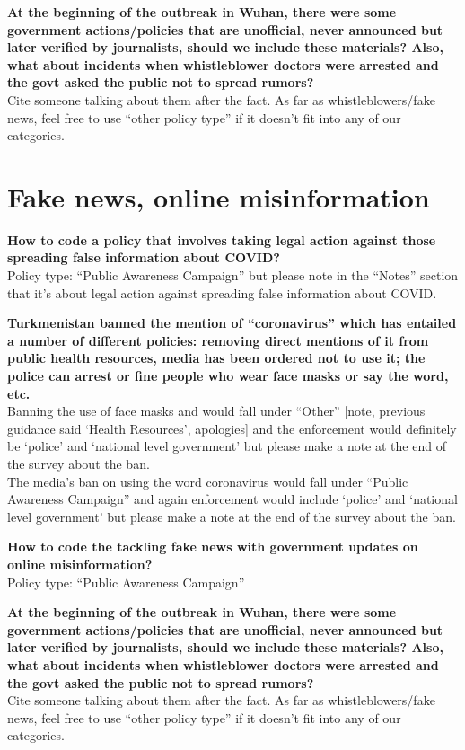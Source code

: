 \documentclass[
]{book}
\begin{document}
\textbf{At the beginning of the outbreak in Wuhan, there were some government actions/policies that are unofficial, never announced but later verified by journalists, should we include these materials? Also, what about incidents when whistleblower doctors were arrested and the govt asked the public not to spread rumors?}\\
Cite someone talking about them after the fact. As far as whistleblowers/fake news, feel free to use ``other policy type'' if it doesn't fit into any of our categories.

\hypertarget{fake-news-online-misinformation}{%
\section{Fake news, online misinformation}\label{fake-news-online-misinformation}}

\textbf{How to code a policy that involves taking legal action against those spreading false information about COVID?}\\
Policy type: ``Public Awareness Campaign'' but please note in the ``Notes'' section that it's about legal action against spreading false information about COVID.

\textbf{Turkmenistan banned the mention of ``coronavirus'' which has entailed a number of different policies: removing direct mentions of it from public health resources, media has been ordered not to use it; the police can arrest or fine people who wear face masks or say the word, etc.}\\
Banning the use of face masks and would fall under ``Other'' {[}note, previous guidance said `Health Resources', apologies{]} and the enforcement would definitely be `police' and `national level government' but please make a note at the end of the survey about the ban.\\
The media's ban on using the word coronavirus would fall under ``Public Awareness Campaign'' and again enforcement would include `police' and `national level government' but please make a note at the end of the survey about the ban.

\textbf{How to code the tackling fake news with government updates on online misinformation?}\\
Policy type: ``Public Awareness Campaign''

\textbf{At the beginning of the outbreak in Wuhan, there were some government actions/policies that are unofficial, never announced but later verified by journalists, should we include these materials? Also, what about incidents when whistleblower doctors were arrested and the govt asked the public not to spread rumors?}\\
Cite someone talking about them after the fact. As far as whistleblowers/fake news, feel free to use ``other policy type'' if it doesn't fit into any of our categories.
\end{document}
